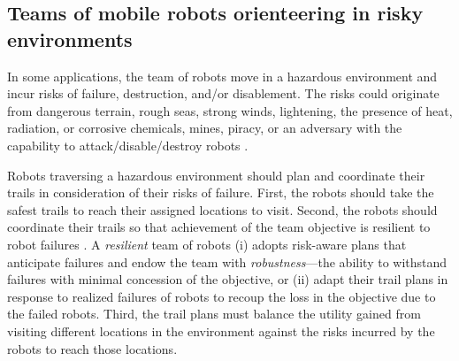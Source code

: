 \documentclass[11pt, oneside]{article}
\begin{document}
\subsection{Teams of mobile robots orienteering in risky environments} 
In some applications, the team of robots move in a hazardous environment and incur risks of failure, destruction, and/or disablement. 
The risks could originate from dangerous terrain, rough seas, strong winds, lightening, the presence of heat, radiation, or corrosive chemicals, mines, piracy, or an adversary with the capability to attack/disable/destroy robots \cite{agmon2017robotic}. 

Robots traversing a hazardous environment should plan and coordinate their trails in consideration of their risks of failure.
First, the robots should take the safest trails to reach their assigned locations to visit. 
Second, the robots should coordinate their trails so that achievement of the team objective is resilient to robot failures \cite{zhou2021multi}. 
A \emph{resilient} team of robots \cite{prorok2021beyond}
(i)
adopts risk-aware plans that anticipate failures and endow the team with \emph{robustness}---the ability to withstand failures with minimal concession of the objective,
or
(ii) adapt their trail plans in response to realized failures of robots to recoup the loss in the objective due to the failed robots. 
Third, the trail plans must balance the utility gained from visiting different locations in the environment against the risks incurred by the robots to reach those locations.
\end{document}
